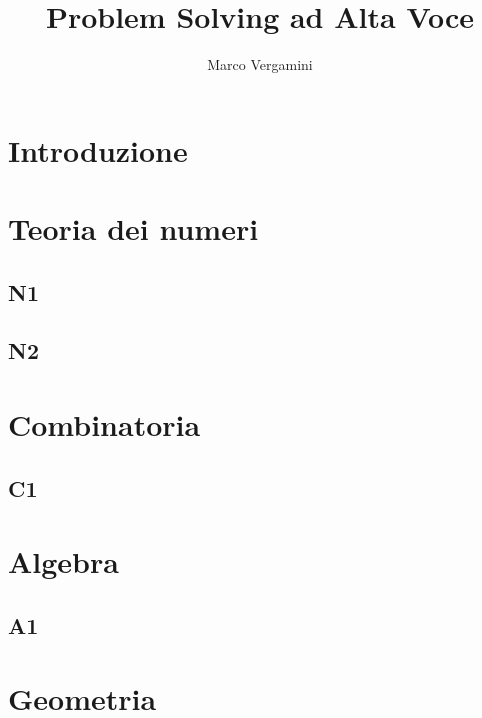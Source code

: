 \documentclass{article}
\title{Problem Solving ad Alta Voce}
\date{}
\author{Marco Vergamini}
\begin{document}
\maketitle
\newpage
\tableofcontents
\newpage


\section*{Introduzione}


\newpage

\section{Teoria dei numeri}

\subsection{N1}


\subsection{N2}


\newpage

\section{Combinatoria}

\subsection{C1}


\newpage

\section{Algebra}

\subsection{A1}


\newpage

\section{Geometria}
\end{document}

